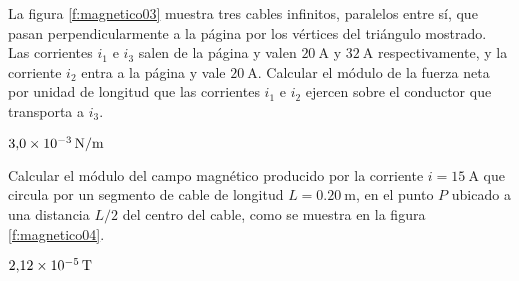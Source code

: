 \begin{minipage}[c]{0.5\textwidth}
\begin{center}
\end{center}
\end{minipage}
%
\begin{Exercise}\label{p:magnetico03}
    La figura \ref{f:magnetico03} muestra tres cables infinitos, paralelos entre sí, que pasan perpendicularmente a la página por los vértices del triángulo mostrado. Las corrientes $i_1$ e $i_3$ salen de la página y valen $\SI{20}{\ampere}$ y $\SI{32}{\ampere}$ respectivamente, y la corriente $i_2$ entra a la página y vale $\SI{20}{\ampere}$. Calcular el módulo de la fuerza neta por unidad de longitud que las corrientes $i_1$ e $i_2$ ejercen sobre el conductor que transporta a $i_3$.
\end{Exercise}
\begin{Answer}
    $\SI{3.0E-3}{\newton/\metre}$
\end{Answer}
%
\begin{Exercise}\label{p:magnetico04}
    Calcular el módulo del campo magnético producido por la corriente $i = \SI{15}{\ampere}$ que circula por un segmento de cable de longitud $L = \SI{0.20}{\metre}$, en el punto $P$ ubicado a una distancia $L/2$ del centro del cable, como se muestra en la figura \ref{f:magnetico04}.
\end{Exercise}
\begin{Answer}
    $\SI{2.12E-5}{\tesla}$
\end{Answer}
%
\noindent
